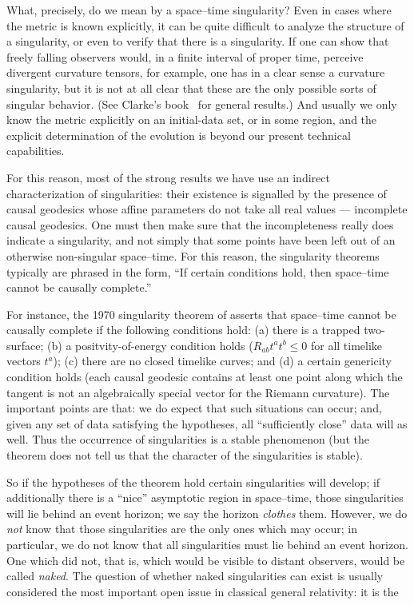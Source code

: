 \documentclass[12pt]{article}
\begin{document}
What, precisely, do we mean by a space--time singularity?
Even in cases where the metric is known explicitly, it can be quite difficult to analyze the structure of a singularity, or even to verify that there is a singularity.  If one can show that freely falling observers would, in a finite interval of proper time, perceive divergent curvature tensors, for example, one has in a clear sense a curvature singularity, but it is not at all clear that these are the only possible sorts of singular behavior.  (See Clarke's book~\citep{Clarke:1993} for general results.)  And usually we only know the metric explicitly on an initial-data set, or in some region, and the explicit determination of the evolution is beyond our present technical capabilities.

For this reason, most of the strong results we have use an indirect characterization of singularities:  their existence is signalled by the presence of causal geodesics whose affine parameters do not take all real values --- incomplete causal geodesics.  One must then make sure that the incompleteness really does indicate a singularity, and not simply that some points have been left out of an otherwise non-singular space--time.  For this reason, the singularity theorems typically are phrased in the form, ``If certain conditions hold, then space--time cannot be causally complete.''

For instance, the 1970 singularity theorem of \citet{HP1970}  asserts that space--time cannot be causally complete if the following conditions hold:  (a) there is a trapped two-surface; (b) a positvity-of-energy condition holds
($R_{ab}t^at^b\leq 0$ for all timelike vectors $t^a$); (c) there are no closed timelike curves; and (d) a certain genericity condition holds (each causal geodesic contains at least one point along which the tangent is not an algebraically special vector for the Riemann curvature). 
The important points are that:  we do expect that such situations can occur; and, given any set of data satisfying  the hypotheses, all ``sufficiently close'' data will as well.  Thus the occurrence of singularities is a stable phenomenon (but the theorem does not tell us that the character of the singularities is stable).

So if the hypotheses of the theorem hold certain singularities will develop; if additionally there is a ``nice'' asymptotic region in space--time, those singularities will lie behind an event horizon; we say the horizon {\em clothes} them.  However, we do {\em not} know that those singularities are the only ones which may occur; in particular, we do not know that all singularities must lie behind an event horizon.  One which did not, that is, which would be visible to distant observers, would be called {\em naked}.  The question of whether naked singularities can exist is usually considered the most important open issue in classical general relativity:  it is the
\end{document}
